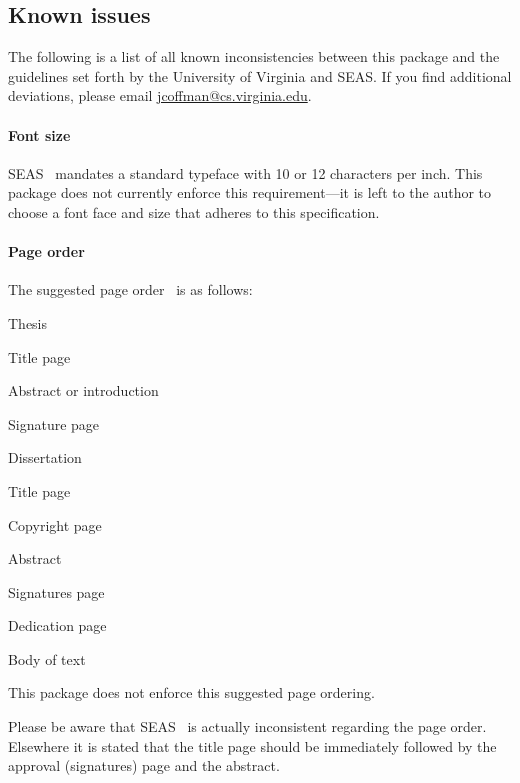 \documentclass[10pt]{article}
\begin{document}
\subsection*{Known issues}
The following is a list of all known inconsistencies between this package and the guidelines set forth by the University of Virginia and \gls{SEAS}.
If you find additional deviations, please email \url{jcoffman@cs.virginia.edu}.

\paragraph{Font size}
\Gls{SEAS}~\cite{seas:instructions} mandates a standard typeface with 10 or 12 characters per inch.
This package does not currently enforce this requirement---it is left to the author to choose a font face and size that adheres to this specification.

\paragraph{Page order}
The suggested page order~\cite{uvaprint:thesis, seas:instructions} is as follows:
\begin{itemize*}
  \item Thesis
  \begin{itemize*}
    \item Title page
    \item Abstract or introduction
    \item Signature page
  \end{itemize*}
  
  \item Dissertation
  \begin{itemize*}
    \item Title page
    \item Copyright page
    \item Abstract
    \item Signatures page
    \item Dedication page
    \item Body of text
  \end{itemize*}
\end{itemize*}
This package does not enforce this suggested page ordering.

Please be aware that \gls{SEAS}~\cite{seas:instructions} is actually inconsistent regarding the page order.
Elsewhere it is stated that the title page should be immediately followed by the approval (signatures) page and the abstract.
\end{document}
